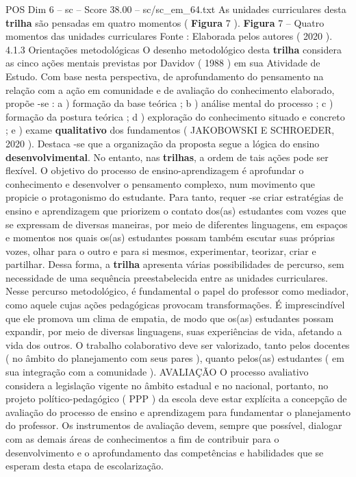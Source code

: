 \begin{textsample}{POS Dim 6 – sc – Score 38.00 – sc/sc\_em\_64.txt}
As unidades curriculares desta \textbf{trilha} são pensadas em quatro momentos ( \textbf{Figura} 7 ). \textbf{Figura} 7 – Quatro momentos das unidades curriculares Fonte : Elaborada pelos autores ( 2020 ). 4.1.3 Orientações metodológicas O desenho metodológico desta \textbf{trilha} considera as cinco ações mentais previstas por Davidov ( 1988 ) em sua Atividade de Estudo.
Com base nesta perspectiva, de aprofundamento do pensamento na relação com a ação em comunidade e de avaliação do conhecimento elaborado, propõe -se : a ) formação da base teórica ; b ) análise mental do processo ; c ) formação da postura teórica ; d ) exploração do conhecimento situado e concreto ; e ) exame \textbf{qualitativo} dos fundamentos ( JAKOBOWSKI E SCHROEDER, 2020 ).
Destaca -se que a organização da proposta segue a lógica do ensino \textbf{desenvolvimental}.
No entanto, nas \textbf{trilhas}, a ordem de tais ações pode ser flexível.
O objetivo do processo de ensino-aprendizagem é aprofundar o conhecimento e desenvolver o pensamento complexo, num movimento que propicie o protagonismo do estudante.
Para tanto, requer -se criar estratégias de ensino e aprendizagem que priorizem o contato dos(as) estudantes com vozes que se expressam de diversas maneiras, por meio de diferentes linguagens, em espaços e momentos nos quais os(as) estudantes possam também escutar suas próprias vozes, olhar para o outro e para si mesmos, experimentar, teorizar, criar e partilhar.
Dessa forma, a \textbf{trilha} apresenta várias possibilidades de percurso, sem necessidade de uma sequência preestabelecida entre as unidades curriculares.
Nesse percurso metodológico, é fundamental o papel do professor como mediador, como aquele cujas ações pedagógicas provocam transformações.
É imprescindível que ele promova um clima de empatia, de modo que os(as) estudantes possam expandir, por meio de diversas linguagens, suas experiências de vida, afetando a vida dos outros.
O trabalho colaborativo deve ser valorizado, tanto pelos docentes ( no âmbito do planejamento com seus pares ), quanto pelos(as) estudantes ( em sua integração com a comunidade ).
AVALIAÇÃO O processo avaliativo considera a legislação vigente no âmbito estadual e no nacional, portanto, no projeto político-pedagógico ( PPP ) da escola deve estar explícita a concepção de avaliação do processo de ensino e aprendizagem para fundamentar o planejamento do professor.
Os instrumentos de avaliação devem, sempre que possível, dialogar com as demais áreas de conhecimentos a fim de contribuir para o desenvolvimento e o aprofundamento das competências e habilidades que se esperam desta etapa de escolarização.

\end{textsample}
